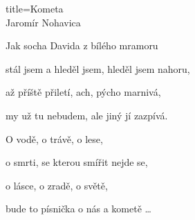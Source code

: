 \begin{song}{title=\centering Kometa \\\normalsize Jaromír Nohavica \vspace*{-0.3cm}}
{\begin{minipage}[t]{0.48\textwidth}
\end{minipage}\begin{minipage}[t]{0.48\textwidth}\setlength{\parindent}{0.45cm}\vspace*{0.55cm}  %

\sloka
	Jak socha Davida z bílého mramoru
	
	stál jsem a hleděl jsem, hleděl jsem nahoru,
	
	až příště přiletí, ach, pýcho marnivá,
	
	my už tu nebudem, ale jiný jí zazpívá.


	O vodě, o trávě, o lese,
	
	o smrti, se kterou smířit nejde se,
	
	o lásce, o zradě, o světě,
	
	bude to písnička o nás a kometě \dots

\end{minipage}
}
\setcounter{Slokočet}{0}
\end{song}


